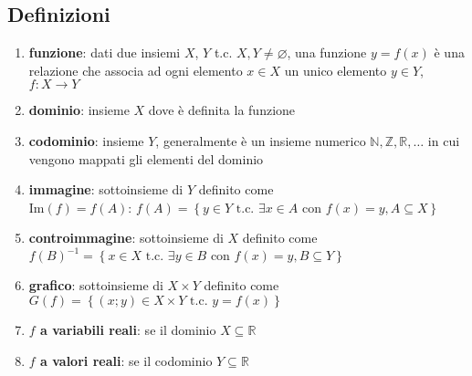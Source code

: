 \documentclass[a4paper]{article}
\newcommand\Img{\text{Im}}
\begin{document}
\subsection*{Definizioni}
\begin{enumerate}
	\item \textbf{funzione}: dati due insiemi \(X\), \(Y\) t.c. \(X,Y \neq \varnothing\), una funzione \(y = f(x)\) è una relazione che associa
	ad ogni elemento \(x \in X\) un unico elemento \(y \in Y\), \(f : X \to Y\)
	\item \textbf{dominio}: insieme \(X\) dove è definita la funzione
	\item \textbf{codominio}: insieme \(Y\), generalmente è un insieme numerico \(\mathbb{N}, \mathbb{Z}, \mathbb{R}, \dots\) in cui vengono mappati gli 
	elementi del dominio
	\item \textbf{immagine}: sottoinsieme di \(Y\) definito come \\ \(\Img(f) = f(A)\): \(f(A) = \left\{ y \in Y  \text{ t.c. } \exists x \in A \text{ con } f(x) = y, A \subseteq X \right\}\)
	\item \textbf{controimmagine}: sottoinsieme di \(X\) definito come \\ \(f(B) ^ {-1} = \left\{ x \in X  \text{ t.c. } \exists y \in B \text{ con } f(x) = y, B \subseteq Y \right\}\)
	\item \textbf{grafico}: sottoinsieme di \(X \times Y\) definito come \(G(f) = \left\{ \left( x; y \right) \in X \times Y \text{ t.c. } y = f(x) \right\}\)
	\item \textbf{\(f\) a variabili reali}: se il dominio \(X \subseteq \mathbb{R}\)
	\item \textbf{\(f\) a valori reali}: se il codominio \(Y \subseteq \mathbb{R}\)
\end{enumerate}
\end{document}
